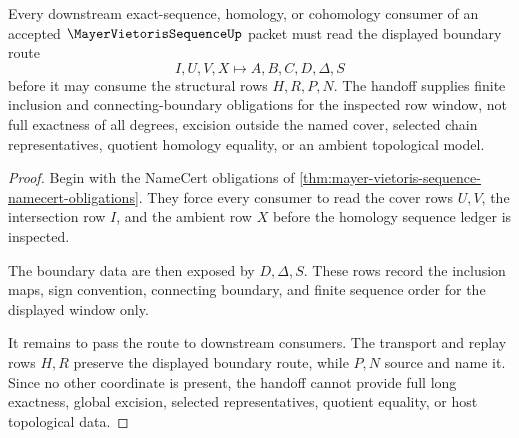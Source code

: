 \begin{theorem}
\label{thm:mayer-vietoris-sequence-boundary-handoff}
Every downstream exact-sequence, homology, or cohomology consumer of an accepted $\MayerVietorisSequenceUp$ packet must read the displayed boundary route
$$
I,U,V,X \longmapsto A,B,C,D,\Delta,S
$$
before it may consume the structural rows $H,R,P,N$. The handoff supplies finite inclusion and connecting-boundary obligations for the inspected row window, not full exactness of all degrees, excision outside the named cover, selected chain representatives, quotient homology equality, or an ambient topological model.
\end{theorem}
\begin{proof}
Begin with the NameCert obligations of \autoref{thm:mayer-vietoris-sequence-namecert-obligations}. They force every consumer to read the cover rows $U,V$, the intersection row $I$, and the ambient row $X$ before the homology sequence ledger is inspected.

The boundary data are then exposed by $D,\Delta,S$. These rows record the inclusion maps, sign convention, connecting boundary, and finite sequence order for the displayed window only.

It remains to pass the route to downstream consumers. The transport and replay rows $H,R$ preserve the displayed boundary route, while $P,N$ source and name it. Since no other coordinate is present, the handoff cannot provide full long exactness, global excision, selected representatives, quotient equality, or host topological data.
\end{proof}


\begin{closurestatus}{\MayerVietorisSequenceUp}
  \theoryclosure{\seedClosure}
  \formalstatus{\theoremCheckedV}
\end{closurestatus}
